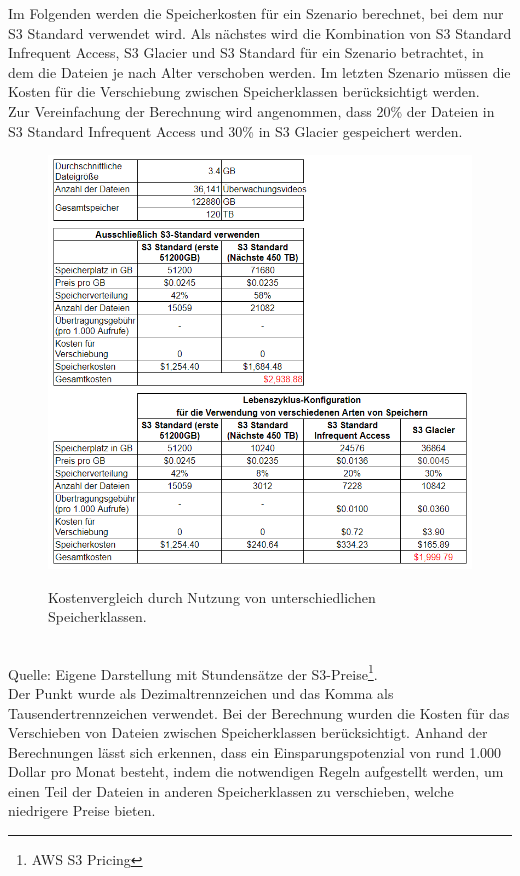 Im Folgenden werden die Speicherkosten für ein Szenario berechnet, bei dem nur S3 Standard verwendet wird. Als nächstes wird die Kombination von S3 Standard Infrequent Access, S3 Glacier und S3 Standard für ein Szenario betrachtet, in dem die Dateien je nach Alter verschoben werden. Im letzten Szenario müssen die Kosten für die Verschiebung zwischen Speicherklassen berücksichtigt werden.
\\
Zur Vereinfachung der Berechnung wird angenommen, dass 20\% der Dateien in S3 Standard Infrequent Access und 30\% in S3 Glacier gespeichert werden.
\\
\begin{figure}[h!]
  \centering
  \includegraphics[scale=0.75]{sources/Kostenvergleich_Nutzung_unt_Speicherklassen}
  \caption[Kostenvergleich durch Nutzung von unterschiedlichen Speicherklassen]{}\label{fig:Kostenvergleich_Nutzung_unt_Speicherklassen} 
  Kostenvergleich durch Nutzung von unterschiedlichen Speicherklassen.  
\end{figure}\\
Quelle: Eigene Darstellung mit Stundensätze der S3-Preise\footnote{\cite{AMZ09}AWS S3 Pricing}.\\
Der Punkt wurde als Dezimaltrennzeichen und das Komma als Tausendertrennzeichen verwendet.
Bei der Berechnung wurden die Kosten für das Verschieben von Dateien zwischen Speicherklassen berücksichtigt. 
Anhand der Berechnungen lässt sich erkennen, dass ein Einsparungspotenzial von rund 1.000 Dollar pro Monat besteht, indem die notwendigen Regeln aufgestellt werden, um einen Teil der Dateien in anderen Speicherklassen zu verschieben, welche niedrigere Preise bieten.

